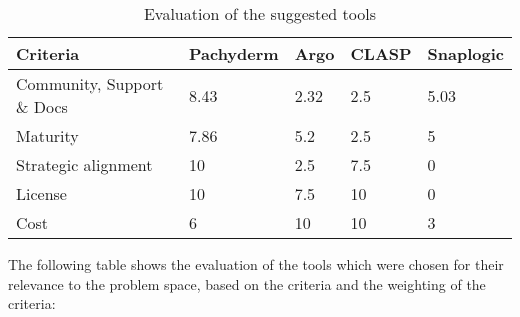 \begin{table}[htb]
    \centering
    \begin{tabular}{|l|l|l|l|l|} \hline
        \textbf{Criteria}                                          & \textbf{Pachyderm}    & \textbf{Argo}         & \textbf{\ac{CLASP}}   & \textbf{Snaplogic}     \\ \hline
        Community, Support \& Docs                                 & 8.43                   & 2.32                   & 2.5                   & 5.03                   \\ \hline
        Maturity                                                   & 7.86                 & 5.2                   & 2.5                   & 5                   \\ \hline
        Strategic alignment                                        & 10                   & 2.5                   & 7.5                   & 0                    \\ \hline
        License                                                    & 10                    & 7.5                     & 10                    & 0                      \\ \hline
        Cost                                                       & 6                      & 10                    & 10                    & 3                      \\ \hline
    \end{tabular}
    \caption{Evaluation of the suggested tools}
    \label{tab:evaluation_of_the_suggested_tools}
\end{table}

The following table shows the evaluation of the tools which were chosen for their relevance to the problem space, based on the criteria and the weighting of the criteria:

